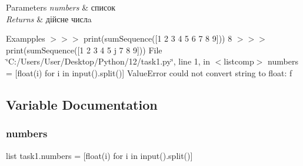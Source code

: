 \begin{DoxyParams}{Parameters}
{\em numbers} & список\\
\hline
{\em Returns} & дійсне числa\\
\hline
\end{DoxyParams}
\begin{DoxyParagraph}{Exampples}
$>$$>$$>$ print(sum\+Sequence(\mbox{[}1 2 3 4 5 6 7 8 9\mbox{]})) 8 $>$$>$$>$ print(sum\+Sequence(\mbox{[}1 2 3 4 5 j 7 8 9\mbox{]})) File \char`\"{}\+C\+:/\+Users/\+User/\+Desktop/\+Python/12/task1.\+py\char`\"{}, line 1, in $<$listcomp$>$ numbers = \mbox{[}float(i) for i in input().split()\mbox{]} Value\+Error could not convert string to float\+: \textquotesingle{}f\textquotesingle{} 
\end{DoxyParagraph}


\subsection{Variable Documentation}
\mbox{\label{namespacetask1_ae2b7e0a217298571816e383a5e4970f9}} 
\subsubsection{\texorpdfstring{numbers}{numbers}}
{\footnotesize\ttfamily list task1.\+numbers = \mbox{[}float(i) for i in input().split()\mbox{]}}

